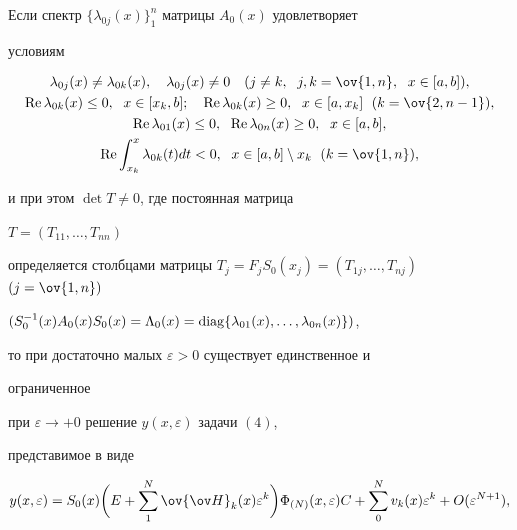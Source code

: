 \begin{thm} 


Если спектр $\{\lambda_{0j}(x)\}^n_1$ матрицы $A_0(x)$ удовлетворяет 


условиям 


\begin{gather*} 


\lambda_{0j}(x)\ne\lambda_{0k}(x),\quad 


\lambda_{0j}(x)\ne0\quad (j\ne k,\ \; j,k=\ov{1,n}, 


\ \; x\in[a,b]),\\ 


\re\lambda_{0k}(x)\le0,\ \; x\in[x_k,b];\quad 


\re\lambda_{0k}(x)\ge0,\ \; x\in[a,x_k]\ \; (k=\ov{2,n-1}),\\ 


\re\lambda_{01}(x)\le0,\ \; \re\lambda_{0n}(x)\ge0, 


\ \; x\in[a,b],\\ 


\re\int^x_{x_k}\lambda_{0k}(t)dt<0, 


\ \; x\in[a,b]\setminus x_k\ \; (k=\ov{1,n}), 


\end{gather*} 


и при этом $\det T\ne0$, где постоянная матрица 


$T=(T_{11},\dotsc,T_{nn})$ 


определяется столбцами матрицы $T_j=F_j 


S_0(x_j)=(T_{1j},\dotsc,T_{nj})$ $(j=\ov{1,n})$ 


$(S^{-1}_0(x)A_0(x)S_0(x)=\Lambda_0(x)= 


\diag\{\lambda_{01}(x),\dotsc,\linebreak \lambda_{0n}(x)\})$, 


то при достаточно малых $\varepsilon>0$ существует единственное и 


ограниченное 


при $\varepsilon\to+0$ решение $y(x,\varepsilon)$ задачи $(4)$, 


представимое в виде 


$$ 


y(x,\varepsilon)=S_0(x)\bigg(E+\sum^N_1\ov{\ov H}_k 


(x)\varepsilon^k\bigg)\Phi_{(N)}(x,\varepsilon)C+ 


\sum^N_0 v_k(x)\varepsilon^k+O(\varepsilon^{N+1}), 


$$ 



\end{thm}
